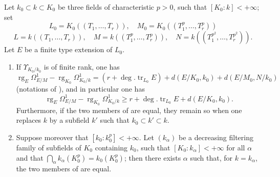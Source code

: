 \begin{proposition}[21.9.6]
\label{0.21.9.6}
Let $k_0\subset k\subset K_0$ be three fields of characteristic $p>0$, such that $[K_0:k]<+\infty$; set
\[
  L_0=K_0((T_1,\ldots,T_r)),\quad M_0=K_0((T_1^p,\ldots,T_r^p))
\]
\[
  L=k((T_1,\ldots,T_r)),\quad M=k((T_1^p,\ldots,T_r^p)),\quad N=k((T_1^{p^2},\ldots,T_r^{p^2})).
\]
Let $E$ be a finite type extension of $L_0$.
\begin{enumerate}
  \item[\rm (i)] If $\Upsilon_{K_0/k_0}$ is of finite rank, one has
  \begin{equation}
  \tag{21.9.6.1}
  \label{0.21.9.6.1}
    \operatorname{rg}_E\Omega^1_{E/M}-\operatorname{rg}_{K_0}\Omega^1_{K_0/k}=(r+\deg.\operatorname{tr}_{L_0} E)+d(E/K_0,k_0)+d(E/M_0,N/k_0)
  \end{equation}
  \textup{(}notations of \textup{)}, and in particular one has
  \begin{equation}
  \tag{21.9.6.2}
  \label{0.21.9.6.2}
    \operatorname{rg}_E\Omega^1_{E/M}-\operatorname{rg}_{K_0}\Omega^1_{K_0/k}\geqslant r+\deg.\operatorname{tr}_{L_0} E+d(E/K_0,k_0).
  \end{equation}
  Furthermore, if the two members of  are equal, they remain so when one replaces $k$ by a subfield $k'$ such that $k_0\subset k'\subset k$.
  \item[\rm (ii)] Suppose moreover that $[k_0:k_0^p]<+\infty$.
  Let $(k_\alpha)$ be a decreasing filtering family of subfields of $K_0$ containing $k_0$, such that $[K_0:k_\alpha]<+\infty$ for all $\alpha$ and that $\bigcap_\alpha k_\alpha(K_0^p)=k_0(K_0^p)$; then there exists $\alpha$ such that, for $k=k_\alpha$, the two members of  are equal.
\end{enumerate}
\end{proposition}


